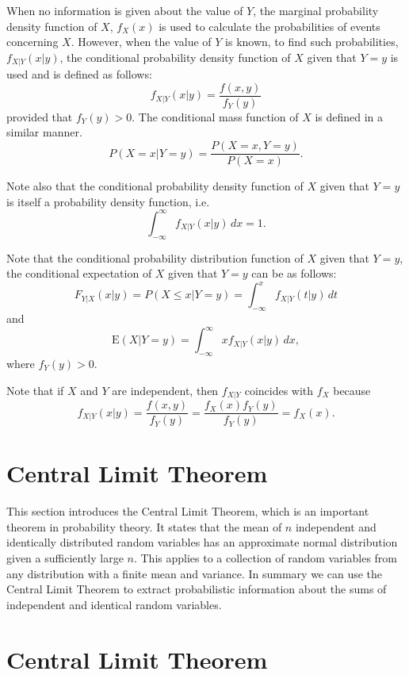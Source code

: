 \documentclass[
]{book}
\theoremstyle{definition}
\theoremstyle{definition}
\theoremstyle{definition}
\theoremstyle{definition}
\theoremstyle{remark}
\begin{document}
When no information is given about the value of \(Y\), the marginal
probability density function of \(X\), \(f_X(x)\) is used to calculate the
probabilities of events concerning \(X\). However, when the value of \(Y\)
is known, to find such probabilities, \(f_{X|Y} (x|y)\), the conditional
probability density function of \(X\) given that \(Y = y\) is used and is
defined as follows: \[f_{X|Y} (x|y)  = \frac{f(x,y)}{f_Y(y)}\] provided
that \(f_Y (y) > 0\). The conditional mass function of \(X\) is defined in a
similar manner. \[P(X = x | Y = y) = \frac{P(X = x, Y = y)}{P(X = x)}.\]

Note also that the conditional probability density function of \(X\) given
that \(Y = y\) is itself a probability density function, i.e.
\[\int_{-\infty}^\infty f_{X|Y}(x|y)\, dx  =  1.\]

Note that the conditional probability distribution function of \(X\) given
that \(Y = y\), the conditional expectation of \(X\) given that \(Y = y\) can
be as follows:
\[F_{Y|X}(x|y) = P(X \le x | Y = y) = \int_ {-\infty}^x f_{X|Y}(t|y) \, dt\]
and
\[\mathrm{E}(X|Y = y) =  \int_{-\infty}^{\infty} x  f_{X|Y}(x|y) \, dx,\]
where \(f_Y(y) > 0\).

Note that if \(X\) and \(Y\) are independent, then \(f_{X|Y}\) coincides with
\(f_X\) because
\[f_{X|Y}(x|y) = \frac{f(x,y)}{f_Y(y)} =\frac{f_X(x)f_Y(y)}{f_Y(y)} = f_X(x).\]

\hypertarget{central-limit-theorem}{%
\section{Central Limit Theorem}\label{central-limit-theorem}}

This section introduces the Central Limit Theorem, which is an important
theorem in probability theory. It states that the mean of \(n\)
independent and identically distributed random variables has an
approximate normal distribution given a sufficiently large \(n\). This
applies to a collection of random variables from any distribution with a
finite mean and variance. In summary we can use the Central Limit
Theorem to extract probabilistic information about the sums of
independent and identical random variables.

\hypertarget{central-limit-theorem-1}{%
\section*{Central Limit Theorem}\label{central-limit-theorem-1}}
\end{document}
